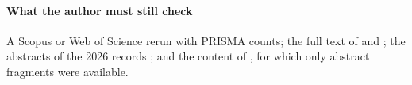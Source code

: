 \documentclass[preprint,12pt]{elsarticle}
\begin{document}
\paragraph{What the author must still check} A Scopus or Web of Science rerun with PRISMA counts; the full text of \cite{Beauchene2016} and \cite{Feik2026}; the abstracts of the 2026 records \cite{Zhou2026,Zhou2026trb,LiuMaMa2026,Salarpour2026}; and the content of \cite{Gao2025tre,Li2024}, for which only abstract fragments were available.



\end{document}

